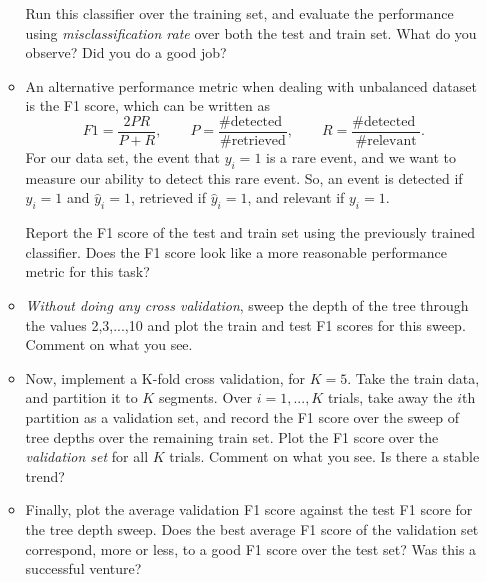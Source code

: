 \documentclass{article}
\begin{document}
\begin{enumerate}
\begin{itemize}
Run this classifier over the training set, and evaluate the performance using \emph{misclassification rate} over both the test and train set. What do you observe? Did you do a good job? 






\item An alternative performance metric when dealing with unbalanced dataset is the F1 score, which can be written as 
\[
F1 = \frac{2PR}{P+R}, \qquad P = \frac{\text{\# detected }}{\text{\# retrieved}}, \qquad R = \frac{\text{\# detected }}{\text{\# relevant}}.
\]
For our data set, the event that $y_i = 1$ is a rare event, and we want to measure our ability to detect this rare event. So, an event is detected if $y_i = 1$ and $\hat y_i = 1$, retrieved if $\hat y_i = 1$, and relevant if $y_i = 1$.

Report the F1 score of the test and train set using the previously trained classifier. Does the F1 score look like a more reasonable performance metric for this task?








\item \emph{Without doing any cross validation}, sweep the depth of the tree through the values 2,3,...,10 and plot the train and test F1 scores for this sweep. Comment on what you see. 






\item Now, implement a K-fold cross validation, for $K = 5$. Take the train data, and partition it to $K$ segments. Over $i=1,...,K$ trials, take away the $i$th partition as a validation set, and record the F1 score over the sweep of tree depths over the remaining train set. Plot the F1 score over the \emph{validation set} for all $K$ trials. Comment on what you see. Is there a stable trend? 





\item Finally, plot the average validation F1 score against the test F1 score for the tree depth sweep. Does the best average F1 score of the validation set correspond, more or less, to a good F1 score  over the test set? Was this a successful venture? 




\end{itemize}




\end{enumerate}
\end{document}

